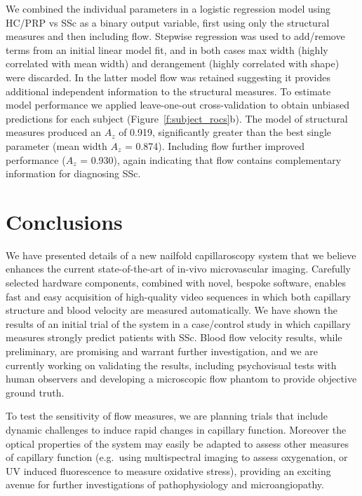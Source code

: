 \documentclass[runningheads,a4paper]{llncs}
\newcommand{\fref}[1]{Figure~\ref{#1}}
\def\eg{e.g.}
\begin{document}
We combined the individual parameters in a logistic regression model using  HC/PRP vs SSc as a binary output variable, first using only the structural measures and then including flow. Stepwise regression was used to add/remove terms from an initial linear model fit, and in both cases max width (highly correlated with mean width) and derangement (highly correlated with shape) were discarded. In the latter model flow was retained suggesting it provides additional independent information to the structural measures. To estimate model performance we applied leave-one-out cross-validation to obtain unbiased predictions for each subject (\fref{f:subject_rocs}b). The model of structural measures produced an $A_z$ of 0.919, significantly greater than the best single parameter (mean width $A_z$ = 0.874). Including flow further improved performance ($A_z$ = 0.930), again indicating that flow contains complementary information for diagnosing SSc.
%
\section{Conclusions}
\label{s:conclusions}
We have presented details of a new nailfold capillaroscopy system that we believe enhances the current state-of-the-art of in-vivo microvascular imaging. Carefully selected hardware components, combined with novel, bespoke software, enables fast and easy acquisition of high-quality video sequences in which both capillary structure and blood velocity are measured automatically. We have shown the results of an initial trial of the system in a case/control study in which capillary measures strongly predict patients with SSc. Blood flow velocity results, while preliminary, are promising and warrant further investigation, and we are currently working on validating the results, including psychovisual tests with human observers and developing a microscopic flow phantom to provide objective ground truth.

To test the sensitivity of flow measures, we are planning trials that include dynamic challenges to induce rapid changes in capillary function. Moreover the optical properties of the system may easily be adapted to assess other measures of capillary function (\eg~using multispectral imaging to assess oxygenation, or UV induced fluorescence  to measure oxidative stress), providing an exciting avenue for further investigations of pathophysiology and microangiopathy. 




\end{document}
